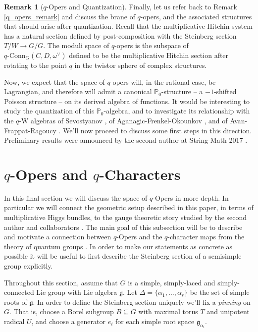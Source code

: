 \documentclass[11pt, oneside, reqno]{amsart}
\theoremstyle{definition} \newtheorem{definition}{Definition}[section]
\theoremstyle{definition} \newtheorem{remark}[definition]{Remark}
\theoremstyle{definition} \newtheorem{remarks}[definition]{Remarks}
\theoremstyle{definition} \newtheorem{question}[definition]{Question}
\theoremstyle{definition} \newtheorem*{note}{Note}
\theoremstyle{definition} \newtheorem{example}[definition]{Example}
\theoremstyle{definition} \newtheorem{examples}[definition]{Examples}
\renewcommand{\gg}{\mathfrak{g}}
\newcommand{\bb}[1]{\mathbb{#1}}
\newcommand{\sub}{\subseteq}
\newcommand{\qconn}{q\text{-Conn}}
\begin{document}
\begin{remark}[$q$-Opers and Quantization]
Finally, let us refer back to Remark \ref{q_opers_remark} and discuss the brane of $q$-opers, and the associated structures that should arise after quantization.  Recall that the multiplicative Hitchin system has a natural section defined by post-composition with the Steinberg section $T/W \to G/G$.  The moduli space of $q$-opers is the subspace of $\qconn_G(C,D,\omega^\vee)$ defined to be the multiplicative Hitchin section after rotating to the point $q$ in the twistor sphere of complex structures.

Now, we expect that the space of $q$-opers will, in the rational case, be Lagrangian, and therefore will admit a canonical $\bb P_0$-structure -- a $-1$-shifted Poisson structure -- on its derived algebra of functions.  It would be interesting to study the quantization of this $\bb P_0$-algebra, and to investigate its relationship with the $q$-W algebras of Sevostyanov \cite{Knight,STSSevostyanov, Sevostyanov}, of Aganagic-Frenkel-Okounkov \cite{AFO}, and of Avan-Frappat-Ragoucy \cite{AvanFrappatRagoucy}.  We'll now proceed to discuss some first steps in this direction.  Preliminary results were announced by the second author at String-Math 2017 \cite{PestunStringMath}.  
\end{remark}

\section{$q$-Opers and $q$-Characters} \label{qchar_section}

In this final section we will discuss the space of $q$-Opers in more depth.  In particular we will connect the geometric setup described in this paper, in terms of multiplicative Higgs bundles, to the gauge theoretic story studied by the second author and collaborators \cite{NekrasovPestunShatashvili,Kimura:2015rgi,Nekrasov:2015wsu}.  The main goal of this subsection will be to describe and motivate a connection between $q$-Opers and the $q$-character maps from the theory of quantum groups \cite{FrenkelReshetikhinSTS,FrenkelReshetikhin2,FrenkelReshetikhin1,Sevostyanov,STSSevostyanov,Sevostyanov1}.  In order to make our statements as concrete as possible it will be useful to first describe the Steinberg section \cite{Steinberg} of a semisimple group explicitly.

Throughout this section, assume that $G$ is a simple, simply-laced and simply-connected Lie group with Lie algebra $\gg$.  Let $\Delta = \{\alpha_1, \ldots, \alpha_r\}$ be the set of simple roots of $\gg$.  In order to define the Steinberg section uniquely we'll fix a \emph{pinning} on $G$.  That is, choose a Borel subgroup $B \sub G$ with maximal torus $T$ and unipotent radical $U$, and choose a generator $e_i$ for each simple root space $\gg_{\alpha_i}$.
\end{document}
